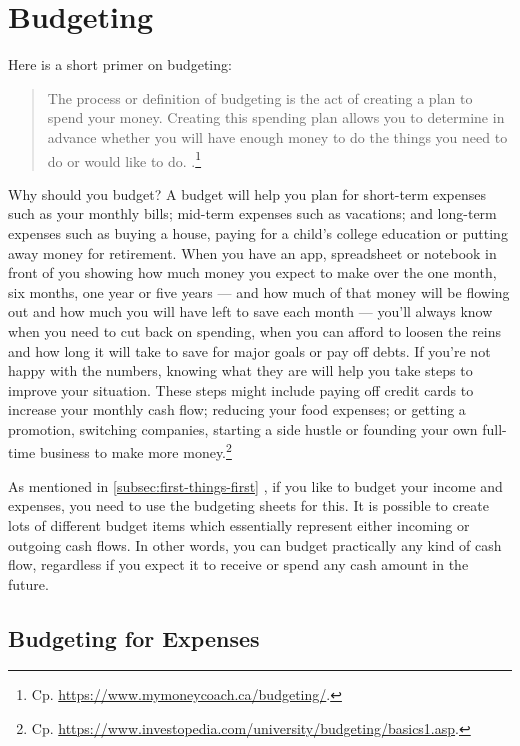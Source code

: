 \section{Budgeting}
\label{section:Budgeting}

Here is a short primer on budgeting:
\begin{quote}\small
	The process or definition of budgeting is the act of creating a plan to spend your money.
	Creating this spending plan allows you to determine in advance whether you will have enough money to do the things you need to do or would like to do. .\footnote{Cp. \url{https://www.mymoneycoach.ca/budgeting/}.}
\end{quote}

Why should you budget? A budget will help you plan for short-term expenses such as your monthly bills; mid-term expenses such as vacations; and long-term expenses such as buying a house, paying for a child’s college education or putting away money for retirement.
When you have an app, spreadsheet or notebook in front of you showing how much money you expect to make over the one month, six months, one year or five years — and how much of that money will be flowing out and how much you will have left to save each month — you’ll always know when you need to cut back on spending, when you can afford to loosen the reins and how long it will take to save for major goals or pay off debts.
If you’re not happy with the numbers, knowing what they are will help you take steps to improve your situation.
These steps might include paying off credit cards to increase your monthly cash flow; reducing your food expenses; or getting a promotion, switching companies, starting a side hustle or founding your own full-time business to make more money.\footnote{Cp. \url{https://www.investopedia.com/university/budgeting/basics1.asp}.}

As mentioned in \autoref{subsec:first-things-first} , if you like to budget your income and expenses, you need to use the budgeting sheets for this.
It is possible to create lots of different budget items which essentially represent either incoming or outgoing cash flows.
In other words, you can budget practically any kind of cash flow, regardless if you expect it to receive or spend any cash amount in the future.

\subsection{Budgeting for Expenses}
\label{subsec:budgeting-expenses}

